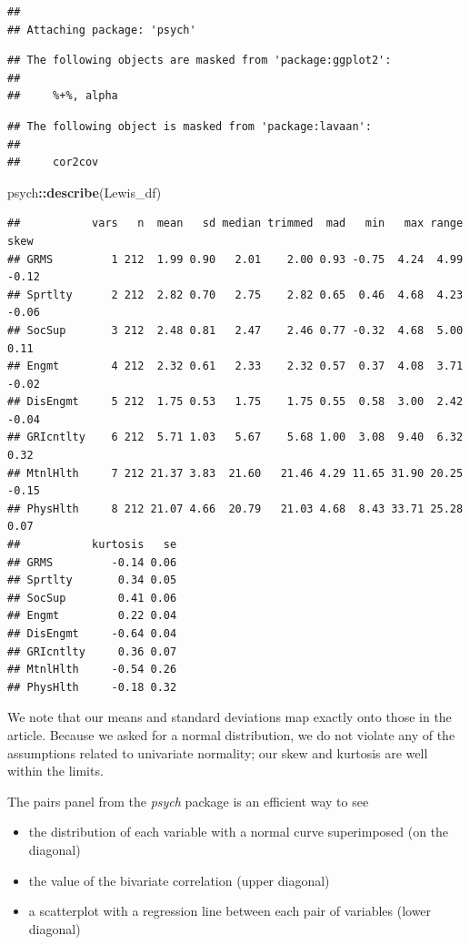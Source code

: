 \documentclass[
  11pt,
]{book}
\newenvironment{Shaded}{\begin{snugshade}}{\end{snugshade}}
\newcommand{\FunctionTok}[1]{\textcolor[rgb]{0.27,0.27,0.27}{\textbf{#1}}}
\newcommand{\NormalTok}[1]{#1}
\newcommand{\SpecialCharTok}[1]{\textcolor[rgb]{0.43,0.43,0.43}{\textbf{#1}}}
\providecommand{\tightlist}{%
  \setlength{\itemsep}{0pt}\setlength{\parskip}{0pt}}
\begin{document}
\begin{verbatim}
## 
## Attaching package: 'psych'
\end{verbatim}

\begin{verbatim}
## The following objects are masked from 'package:ggplot2':
## 
##     %+%, alpha
\end{verbatim}

\begin{verbatim}
## The following object is masked from 'package:lavaan':
## 
##     cor2cov
\end{verbatim}

\begin{Shaded}
\begin{Highlighting}[]
\NormalTok{psych}\SpecialCharTok{::}\FunctionTok{describe}\NormalTok{(Lewis\_df)}
\end{Highlighting}
\end{Shaded}

\begin{verbatim}
##           vars   n  mean   sd median trimmed  mad   min   max range  skew
## GRMS         1 212  1.99 0.90   2.01    2.00 0.93 -0.75  4.24  4.99 -0.12
## Sprtlty      2 212  2.82 0.70   2.75    2.82 0.65  0.46  4.68  4.23 -0.06
## SocSup       3 212  2.48 0.81   2.47    2.46 0.77 -0.32  4.68  5.00  0.11
## Engmt        4 212  2.32 0.61   2.33    2.32 0.57  0.37  4.08  3.71 -0.02
## DisEngmt     5 212  1.75 0.53   1.75    1.75 0.55  0.58  3.00  2.42 -0.04
## GRIcntlty    6 212  5.71 1.03   5.67    5.68 1.00  3.08  9.40  6.32  0.32
## MtnlHlth     7 212 21.37 3.83  21.60   21.46 4.29 11.65 31.90 20.25 -0.15
## PhysHlth     8 212 21.07 4.66  20.79   21.03 4.68  8.43 33.71 25.28  0.07
##           kurtosis   se
## GRMS         -0.14 0.06
## Sprtlty       0.34 0.05
## SocSup        0.41 0.06
## Engmt         0.22 0.04
## DisEngmt     -0.64 0.04
## GRIcntlty     0.36 0.07
## MtnlHlth     -0.54 0.26
## PhysHlth     -0.18 0.32
\end{verbatim}

We note that our means and standard deviations map exactly onto those in the article. Because we asked for a normal distribution, we do not violate any of the assumptions related to univariate normality; our skew and kurtosis are well within the limits.

The pairs panel from the \emph{psych} package is an efficient way to see

\begin{itemize}
\tightlist
\item
  the distribution of each variable with a normal curve superimposed (on the diagonal)
\item
  the value of the bivariate correlation (upper diagonal)
\item
  a scatterplot with a regression line between each pair of variables (lower diagonal)
\end{itemize}
\end{document}
